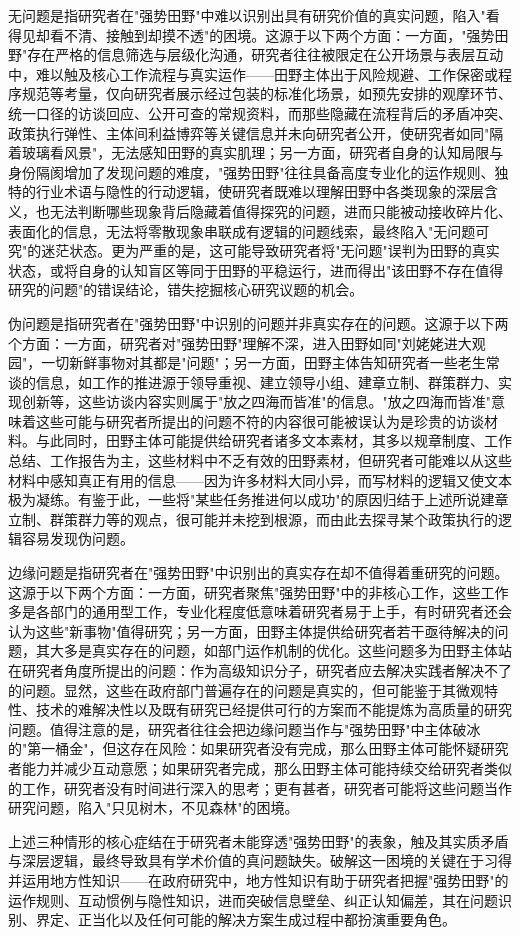 \documentclass[12pt,a4paper]{article}
\begin{document}
无问题是指研究者在"强势田野"中难以识别出具有研究价值的真实问题，陷入"看得见却看不清、接触到却摸不透"的困境。这源于以下两个方面：一方面，"强势田野"存在严格的信息筛选与层级化沟通，研究者往往被限定在公开场景与表层互动中，难以触及核心工作流程与真实运作——田野主体出于风险规避、工作保密或程序规范等考量，仅向研究者展示经过包装的标准化场景，如预先安排的观摩环节、统一口径的访谈回应、公开可查的常规资料，而那些隐藏在流程背后的矛盾冲突、政策执行弹性、主体间利益博弈等关键信息并未向研究者公开，使研究者如同"隔着玻璃看风景"，无法感知田野的真实肌理；另一方面，研究者自身的认知局限与身份隔阂增加了发现问题的难度，"强势田野"往往具备高度专业化的运作规则、独特的行业术语与隐性的行动逻辑，使研究者既难以理解田野中各类现象的深层含义，也无法判断哪些现象背后隐藏着值得探究的问题，进而只能被动接收碎片化、表面化的信息，无法将零散现象串联成有逻辑的问题线索，最终陷入"无问题可究"的迷茫状态。更为严重的是，这可能导致研究者将"无问题"误判为田野的真实状态，或将自身的认知盲区等同于田野的平稳运行，进而得出"该田野不存在值得研究的问题"的错误结论，错失挖掘核心研究议题的机会。



伪问题是指研究者在"强势田野"中识别的问题并非真实存在的问题。这源于以下两个方面：一方面，研究者对"强势田野"理解不深，进入田野如同"刘姥姥进大观园"，一切新鲜事物对其都是"问题"；另一方面，田野主体告知研究者一些老生常谈的信息，如工作的推进源于领导重视、建立领导小组、建章立制、群策群力、实现创新等，这些访谈内容实则属于"放之四海而皆准"的信息。"放之四海而皆准"意味着这些可能与研究者所提出的问题不符的内容很可能被误认为是珍贵的访谈材料。与此同时，田野主体可能提供给研究者诸多文本素材，其多以规章制度、工作总结、工作报告为主，这些材料中不乏有效的田野素材，但研究者可能难以从这些材料中感知真正有用的信息——因为许多材料大同小异，而写材料的逻辑又使文本极为凝练。有鉴于此，一些将"某些任务推进何以成功"的原因归结于上述所说建章立制、群策群力等的观点，很可能并未挖到根源，而由此去探寻某个政策执行的逻辑容易发现伪问题。



边缘问题是指研究者在"强势田野"中识别出的真实存在却不值得着重研究的问题。这源于以下两个方面：一方面，研究者聚焦"强势田野"中的非核心工作，这些工作多是各部门的通用型工作，专业化程度低意味着研究者易于上手，有时研究者还会认为这些"新事物"值得研究；另一方面，田野主体提供给研究者若干亟待解决的问题，其大多是真实存在的问题，如部门运作机制的优化。这些问题多为田野主体站在研究者角度所提出的问题：作为高级知识分子，研究者应去解决实践者解决不了的问题。显然，这些在政府部门普遍存在的问题是真实的，但可能鉴于其微观特性、技术的难解决性以及既有研究已经提供可行的方案而不能提炼为高质量的研究问题。值得注意的是，研究者往往会把边缘问题当作与"强势田野"中主体破冰的"第一桶金"，但这存在风险：如果研究者没有完成，那么田野主体可能怀疑研究者能力并减少互动意愿；如果研究者完成，那么田野主体可能持续交给研究者类似的工作，研究者没有时间进行深入的思考；更有甚者，研究者可能将这些问题当作研究问题，陷入"只见树木，不见森林"的困境。



上述三种情形的核心症结在于研究者未能穿透"强势田野"的表象，触及其实质矛盾与深层逻辑，最终导致具有学术价值的真问题缺失。破解这一困境的关键在于习得并运用地方性知识——在政府研究中，地方性知识有助于研究者把握"强势田野"的运作规则、互动惯例与隐性知识，进而突破信息壁垒、纠正认知偏差，其在问题识别、界定、正当化以及任何可能的解决方案生成过程中都扮演重要角色。
\par{}
\end{document}
